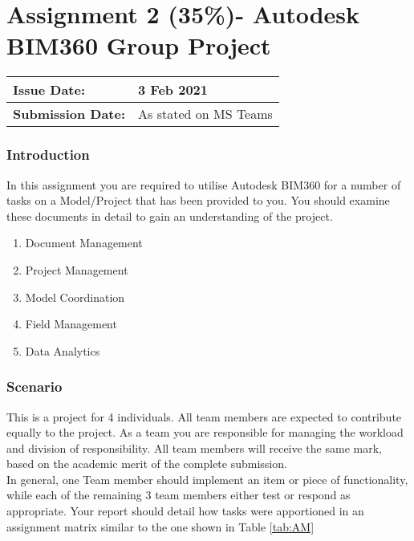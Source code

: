 
	

\part*{Assignment 2 (35\%)- Autodesk BIM360 Group Project}


\begin{tabularx}{\textwidth}{ |X|X| }
	\hline
	\textbf{Issue Date:} & 3 Feb 2021\\
	\hline 
	\textbf{Submission Date:}  & As stated on MS Teams\\
	\hline
\end{tabularx}

\section*{Introduction}

In this assignment you are required to utilise Autodesk BIM360 for a number of tasks on a Model/Project that has been provided to you.  You should examine these documents in detail to gain an understanding of the project.\\

\begin{enumerate}
	\item Document Management 
	\item Project Management
	\item Model Coordination
	\item Field Management
	\item Data Analytics
\end{enumerate}

\section*{Scenario}



This is a project for 4 individuals. All team members are expected to contribute equally to the project. As a team you are responsible for managing the workload and division of responsibility. All team members will receive the same mark, based on the academic merit of the complete submission.\\


In general, one Team member should implement an item or piece of functionality, while each of the remaining 3 team members either test or respond as appropriate.  Your report should detail how tasks were apportioned in an assignment matrix similar to the one shown in Table \ref{tab:AM}

